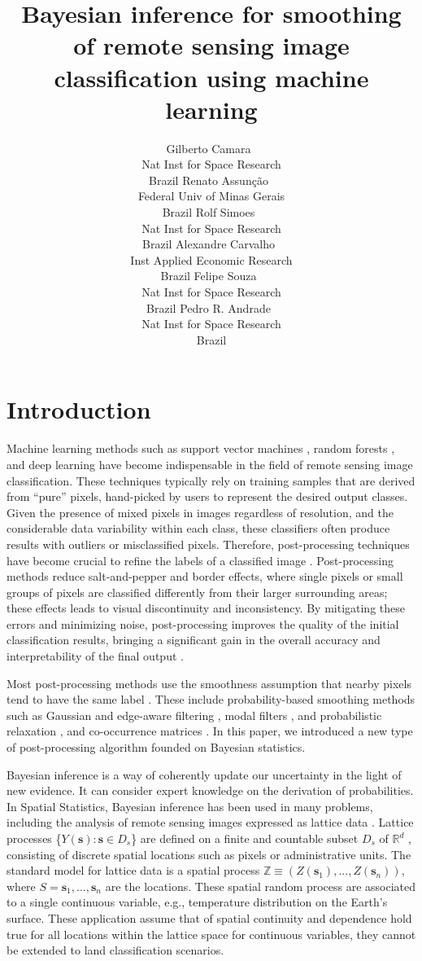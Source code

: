 \documentclass[
  shortnames]{jss}
\author{
Gilberto Camara~\orcidlink{0000-0002-3681-487X}\\Nat Inst for Space Research\\
Brazil \And Renato Assunção~\orcidlink{0000-0001-7442-9166}\\Federal Univ of Minas Gerais\\
Brazil \And Rolf Simoes~\orcidlink{0000-0003-0953-4132}\\Nat Inst for Space Research\\
Brazil \AND Alexandre Carvalho~\orcidlink{0000-0001-8762-5465}\\Inst Applied Economic Research\\
Brazil \And Felipe Souza~\orcidlink{0000-XXXXX}\\Nat Inst for Space Research\\
Brazil \And Pedro R. Andrade~\orcidlink{0000-0001-8675-4046}\\Nat Inst for Space Research\\
Brazil
}
\title{Bayesian inference for smoothing of remote sensing image classification using machine learning}
\begin{document}
\newpage

\hypertarget{introduction}{%
\section{Introduction}\label{introduction}}

Machine learning methods such as support vector machines \citep{Mountrakis2011}, random forests \citep{Belgiu2016}, and deep learning \citep{Ma2019} have become indispensable in the field of remote sensing image classification. These techniques typically rely on training samples that are derived from ``pure'' pixels, hand-picked by users to represent the desired output classes. Given the presence of mixed pixels in images regardless of resolution, and the considerable data variability within each class, these classifiers often produce results with outliers or misclassified pixels. Therefore, post-processing techniques have become crucial to refine the labels of a classified image \citep{Huang2014}. Post-processing methods reduce salt-and-pepper and border effects, where single pixels or small groups of pixels are classified differently from their larger surrounding areas; these effects leads to visual discontinuity and inconsistency. By mitigating these errors and minimizing noise, post-processing improves the quality of the initial classification results, bringing a significant gain in the overall accuracy and interpretability of the final output \citep{Schindler2012}.

Most post-processing methods use the smoothness assumption that nearby pixels tend to have the same label \citep{Schindler2012}. These include probability-based smoothing methods such as Gaussian and edge-aware filtering \citep{Schindler2012}, modal filters \citep{Ghimire2010}, and probabilistic relaxation \citep{Gong1989}, and co-occurrence matrices \citep{Huang2014}. In this paper, we introduced a new type of post-processing algorithm founded on Bayesian statistics.

Bayesian inference is a way of coherently update our uncertainty in the light of new evidence. It can consider expert knowledge on the derivation of probabilities. In Spatial Statistics, Bayesian inference has been used in many problems, including the analysis of remote sensing images expressed as lattice data \citep{Marshall1991, Besag1991, Bivand2013}. Lattice processes \{\(Y(\mathbf{s}): \mathbf{s} \in D_s\)\} are defined on a finite and countable subset \(D_s\) of \(\mathbb{R}^d\) \citep{Cressie2011}, consisting of discrete spatial locations such as pixels or administrative units. The standard model for lattice data is a spatial process \(\mathbb{Z} \equiv (Z(\mathbf{s}_1), ..., Z(\mathbf{s}_n))\), where \(S = {\mathbf{s}_1, ..., \mathbf{s}_n}\) are the locations. These spatial random process are associated to a single continuous variable, e.g., temperature distribution on the Earth's surface. These application assume that of spatial continuity and dependence hold true for all locations within the lattice space for continuous variables, they cannot be extended to land classification scenarios.
\end{document}
